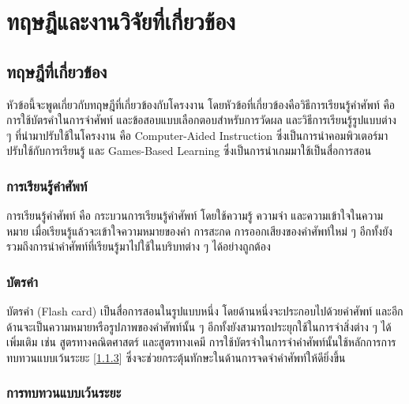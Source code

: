 \documentclass[12pt,oneside,openright,a4paper]{cpe-thai-project}
\begin{document}

\chapter{ทฤษฎีและงานวิจัยที่เกี่ยวข้อง}


\section{ทฤษฎีที่เกี่ยวข้อง}

\hspace{1cm}
หัวข้อนี้จะพูดเกี่ยวกับทฤษฎีที่เกี่ยวข้องกับโครงงาน โดยหัวข้อที่เกี่ยวข้องคือวิธีการเรียนรู้คำศัพท์
คือการใช้บัตรคำในการจำศัพท์ และข้อสอบแบบเลือกตอบสำหรับการวัดผล และวิธีการเรียนรู้รูปแบบต่าง ๆ
ที่นำมาปรับใช้ในโครงงาน คือ Computer-Aided Instruction ซึ่งเป็นการนำคอมพิวเตอร์มาปรับใช้กับการเรียนรู้
และ Games-Based Learning ซึ่งเป็นการนำเกมมาใช้เป็นสื่อการสอน

\subsection{การเรียนรู้คำศัพท์}

\hspace{1cm}
การเรียนรู้คำศัพท์ \cite{LearnEng} คือ กระบวนการเรียนรู้คำศัพท์ โดยใช้ความรู้ ความจำ และความเข้าใจในความหมาย เมื่อเรียนรู้แล้วจะเข้าใจความหมายของคำ
การสะกด การออกเสียงของคำศัพท์ใหม่ ๆ อีกทั้งยังรวมถึงการนำคำศัพท์ที่เรียนรู้มาไปใช้ในบริบทต่าง ๆ ได้อย่างถูกต้อง

\subsection{บัตรคำ}

\hspace{1cm}
บัตรคำ (Flash card) \cite{Flashcard} เป็นสื่อการสอนในรูปแบบหนึ่ง โดยด้านหนึ่งจะประกอบไปด้วยคำศัพท์
และอีกด้านจะเป็นความหมายหรือรูปภาพของคำศัพท์นั้น ๆ อีกทั้งยังสามารถประยุกใช้ในการจำสิ่งต่าง ๆ ได้เพิ่มเติม เช่น
สูตรทางคณิตศาสตร์ และสูตรทางเคมี การใช้บัตรจำในการจำคำศัพท์นั้นใช้หลักการการทบทวนแบบเว้นระยะ [\ref{ssec:SpacedRepetition}]
ซึ่งจะช่วยกระตุ้นทักษะในด้านการจดจำคำศัพท์ให้ดียิ่งขึ้น

\subsection{การทบทวนแบบเว้นระยะ}\label{ssec:SpacedRepetition}
\end{document}
